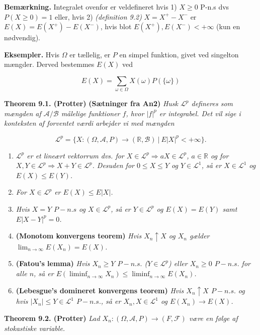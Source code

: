 \documentclass[a4paper,12pt,openany]{book}
\providecommand{\tightlist}{%
 \setlength{\itemsep}{0pt}\setlength{\parskip}{0pt}}
\begin{document}
\textbf{Bemærkning.} Integralet ovenfor er veldefineret hvis 1) \(X\ge 0\) P-n.s dvs \(P(X\ge 0)=1\) eller, hvis 2) \emph{(definition 9.2)} \(X=X^+-X^-\) er \(E(X)=E(X^+)-E(X^-)\), hvis blot \(E(X^+),E(X^-)<+\infty\) (kun en nødvendig).

\textbf{Eksempler.} Hvis \(\Omega\) er tællelig, er \(P\) en simpel funktion, givet ved singelton mængder. Derved bestemmes \(E(X)\) ved

\[
E(X)=\sum_{\omega\in\Omega} X(\omega)P(\{\omega\})
\]

\textbf{Theorem 9.1. (Protter)} \textbf{(Sætninger fra An2)} \emph{Husk \(\mathcal{L}^p\) defineres som mængden af \(\mathcal{A}/\mathcal{B}\) målelige funktioner \(f\), hvor \(\vert f\vert ^p\) er integrabel. Det vil sige i konteksten af forventet værdi arbejder vi med mængden}

\[
\mathcal{L}^p=\{X : (\Omega,\mathcal{A},P)\to(\mathbb{R},\mathcal{B})\ \vert\ E\vert X\vert^p< +\infty\}.
\]

\begin{enumerate}
\def\labelenumi{\alph{enumi}.}
\tightlist
\item
  \emph{\(\mathcal{L}^p\) er et lineært vektorrum dvs. for \(X\in \mathcal{L}^p\Rightarrow aX\in\mathcal{L}^p\), \(a\in\mathbb{R}\) og for \(X,Y\in\mathcal{L}^p\Rightarrow X+Y\in\mathcal{L}^p\). Desuden for \(0\le X\le Y\) og \(Y\in\mathcal{L}^1\), så er \(X\in\mathcal{L}^1\) og \(E(X)\le E(Y)\).}
\item
  \emph{For \(X\in\mathcal{L}^p\) er \(E(X)\le E\vert X\vert\).}
\item
  \emph{Hvis \(X=Y\) \(P-n.s\) og \(X\in\mathcal{L}^p\), så er \(Y\in\mathcal{L}^p\) og \(E(X)=E(Y)\) samt \(E\vert X-Y\vert^p=0\).}
\item
  \textbf{(Monotom konvergens teorem)} \emph{Hvis \(X_n\uparrow X\) og \(X_n\) gælder \(\lim_{n\to \infty} E(X_n)=E(X)\).}
\item
  \textbf{(Fatou's lemma)} \emph{Hvis \(X_n\ge Y\) \(P-n.s.\) (\(Y\in\mathcal{L}^p\)) eller \(X_n\ge 0\) \(P-n.s.\) for alle \(n\), så er \(E(\liminf_{n\to\infty}X_n)\le \liminf_{n\to \infty} E(X_n)\).}
\item
  \textbf{(Lebesgue's domineret konvergens teorem)} \emph{Hvis \(X_n\uparrow X\) \(P-n.s.\) og hvis \(\vert X_n\vert \le Y\in\mathcal{L}^1\) \(P-n.s.\), så er \(X_n,X\in\mathcal{L}^1\) og \(E(X_n)\to E(X)\).}
\end{enumerate}

\textbf{Theorem 9.2. (Protter)} \emph{Lad \(X_n : (\Omega,\mathcal{A},P)\to(F,\mathcal{F})\) være en følge af stokastiske variable.}
\end{document}
